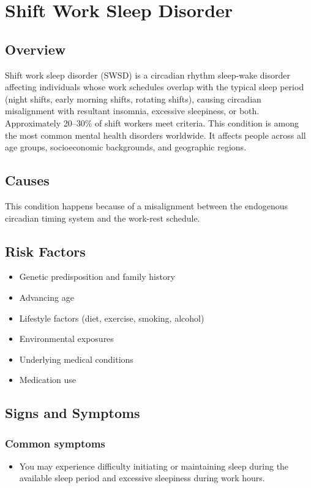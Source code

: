 \chapter{Shift Work Sleep Disorder}
\label{sec:Shift Work Sleep Disorder}

\section{Overview}
Shift work sleep disorder (SWSD) is a circadian rhythm sleep-wake disorder affecting individuals whose work schedules overlap with the typical sleep period (night shifts, early morning shifts, rotating shifts), causing circadian misalignment with resultant insomnia, excessive sleepiness, or both. Approximately 20--30\% of shift workers meet criteria. This condition is among the most common mental health disorders worldwide. It affects people across all age groups, socioeconomic backgrounds, and geographic regions.
\section{Causes}
This condition happens because of a misalignment between the endogenous circadian timing system and the work-rest schedule.     
\section{Risk Factors}

\begin{itemize}[noitemsep]
  \item Genetic predisposition and family history
  \item Advancing age
  \item Lifestyle factors (diet, exercise, smoking, alcohol)
  \item Environmental exposures
  \item Underlying medical conditions
  \item Medication use
\end{itemize}
\section{Signs and Symptoms}

\subsection{Common symptoms}
\begin{itemize}[noitemsep]
  \item You may experience difficulty initiating or maintaining sleep during the available sleep period and excessive sleepiness during work hours. 
  \end{itemize}

